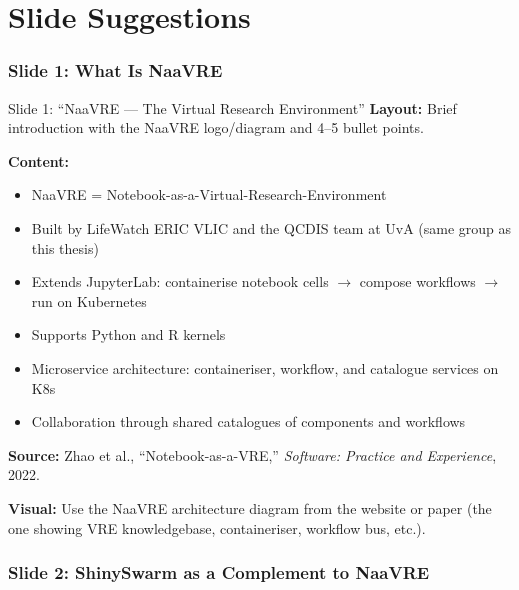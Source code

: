 \documentclass[12pt,a4paper]{article}
\begin{document}
\newpage

\part{Slide Suggestions}

\section{Slide 1: What Is NaaVRE}

\begin{slidebox}{Slide 1: ``NaaVRE --- The Virtual Research Environment''}
\textbf{Layout:} Brief introduction with the NaaVRE logo/diagram and 4--5 bullet points.

\textbf{Content:}
\begin{itemize}[nosep]
  \item NaaVRE = Notebook-as-a-Virtual-Research-Environment
  \item Built by LifeWatch ERIC VLIC and the QCDIS team at UvA (same group as this thesis)
  \item Extends JupyterLab: containerise notebook cells $\rightarrow$ compose workflows $\rightarrow$ run on Kubernetes
  \item Supports Python and R kernels
  \item Microservice architecture: containeriser, workflow, and catalogue services on K8s
  \item Collaboration through shared catalogues of components and workflows
\end{itemize}

\textbf{Source:} Zhao et al., ``Notebook-as-a-VRE,'' \textit{Software: Practice and Experience}, 2022.

\textbf{Visual:} Use the NaaVRE architecture diagram from the website or paper (the one showing VRE knowledgebase, containeriser, workflow bus, etc.).
\end{slidebox}

\section{Slide 2: ShinySwarm as a Complement to NaaVRE}
\end{document}
